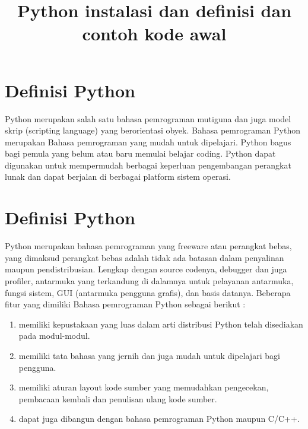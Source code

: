 \documentclass[12pt, times new roman, a4paper]{article}
\begin{document}
\title{Python instalasi dan definisi dan contoh kode awal}
\maketitle

\section{Definisi Python}

Python merupakan salah satu bahasa pemrograman mutiguna dan juga model skrip (scripting language) yang berorientasi obyek. Bahasa pemrograman Python merupakan Bahasa pemrograman yang mudah untuk dipelajari. Python bagus bagi pemula yang belum atau baru memulai belajar coding. Python dapat digunakan untuk mempermudah berbagai keperluan pengembangan perangkat lunak dan dapat berjalan di berbagai platform sistem operasi.


\section{Definisi Python}

Python merupakan bahasa pemrograman yang freeware atau perangkat bebas, yang dimaksud perangkat bebas adalah tidak ada batasan dalam penyalinan maupun pendistribusian.  Lengkap dengan source codenya, debugger dan juga profiler, antarmuka yang terkandung di dalamnya untuk pelayanan antarmuka, fungsi sistem, GUI (antarmuka pengguna grafis), dan basis datanya.
Beberapa fitur yang dimiliki Bahasa pemrograman Python sebagai berikut :
\begin{enumerate}
  \item memiliki kepustakaan yang luas dalam arti distribusi Python telah disediakan pada modul-modul.
  \item memiliki tata bahasa yang jernih dan juga mudah untuk dipelajari bagi pengguna.
  \item memiliki aturan layout kode sumber yang memudahkan pengecekan, pembacaan kembali dan penulisan ulang kode sumber.
  \item dapat juga dibangun dengan bahasa pemrograman Python maupun C/C++.
\end{enumerate}
\end{document}
